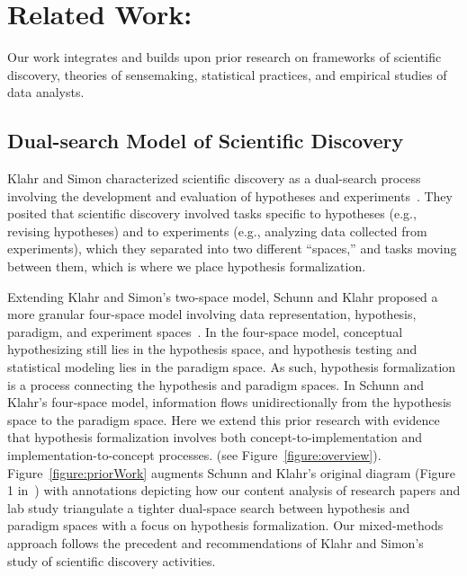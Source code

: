 \section{Related Work: }
Our work integrates and builds upon prior research on frameworks of scientific
discovery, theories of sensemaking, statistical practices, and empirical studies
of data analysts.

\subsection{Dual-search Model of Scientific Discovery}
Klahr and Simon characterized scientific discovery as a dual-search process
involving the development and evaluation of hypotheses and
experiments~\cite{klahr1988dual}. They posited that scientific
discovery involved tasks specific to hypotheses (e.g., revising hypotheses) and
to experiments (e.g., analyzing data collected from experiments), which they
separated into two different ``spaces,'' and tasks moving between them, which is
where we place hypothesis formalization.

Extending Klahr and Simon's two-space model, Schunn and Klahr proposed a more
granular four-space model involving data representation, hypothesis, paradigm,
and experiment spaces~\cite{schunn1995FourSpace,schunn1996BeyondTwoSpace}. In the four-space model, conceptual hypothesizing still lies in the
hypothesis space, and hypothesis testing and statistical modeling lies in the
paradigm space. As such, hypothesis formalization is a process connecting
the hypothesis and paradigm spaces. In Schunn and Klahr's four-space model,
information flows unidirectionally from the hypothesis space to the paradigm space.
Here we extend this prior research with
evidence that hypothesis formalization involves both
concept-to-implementation and implementation-to-concept processes. (see
Figure~\ref{figure:overview}).
Figure~\ref{figure:priorWork} augments Schunn and Klahr's
original diagram (Figure 1 in~\cite{schunn1995FourSpace}) with
annotations depicting how our content analysis of research papers and lab study
triangulate a tighter dual-space search between hypothesis and
paradigm spaces with a focus on hypothesis formalization. Our mixed-methods
approach follows the precedent and recommendations of Klahr and
Simon's~\cite{klahr1999studies} study of scientific discovery activities.


